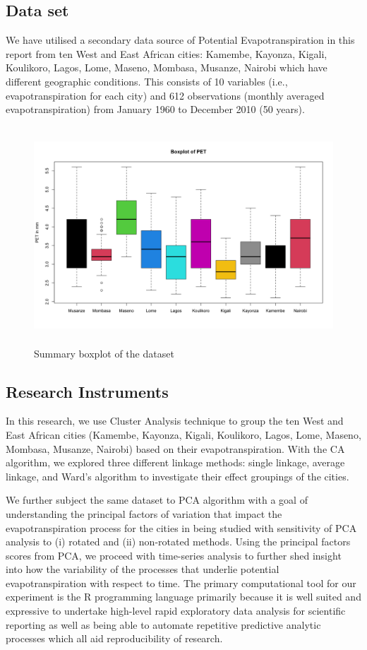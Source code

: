 \documentclass[12pt,a4paper]{article}
\begin{document}
\subsection{Data set}
We have utilised a secondary data source of Potential Evapotranspiration in this report from ten West and East African cities: Kamembe,  Kayonza,  Kigali,  Koulikoro,  Lagos,  Lome,  Maseno,  Mombasa,  Musanze,  Nairobi which have different geographic conditions.  This consists of 10 variables (i.e.,  evapotranspiration for each city) and 612 observations (monthly averaged evapotranspiration) from January 1960 to December 2010 (50 years).
\begin{figure}[!h]
	  \centering
        \includegraphics[height=3.2in]{./gaphics/q001_box.png}
        \caption{Summary boxplot of the dataset}
        \label{fig:box_plot}
\end{figure}

\subsection{Research Instruments}
In this research, we use Cluster Analysis technique to group the ten West and East African cities (Kamembe, Kayonza, Kigali, Koulikoro, Lagos, Lome, Maseno, Mombasa, Musanze, Nairobi) based on their evapotranspiration.
With the CA algorithm, we explored three different linkage methods: single linkage,  average linkage,  and Ward’s algorithm to investigate their effect groupings of the cities\cite{nielsen2016hierarchical}.

We further subject the same dataset to PCA algorithm with a goal of understanding the principal factors of variation that impact the evapotranspiration process for the cities in being studied with  sensitivity of PCA analysis to (i) rotated and (ii) non-rotated methods. Using the principal factors scores from PCA, we proceed with time-series analysis to further shed insight into how the variability of the processes that underlie potential evapotranspiration with respect to time.  
The primary computational tool for our experiment is the R programming language primarily because it is well suited and expressive to undertake high-level rapid exploratory data analysis for scientific reporting as well as being able to automate repetitive predictive analytic processes which all aid reproducibility of research.
\pagebreak
\end{document}
